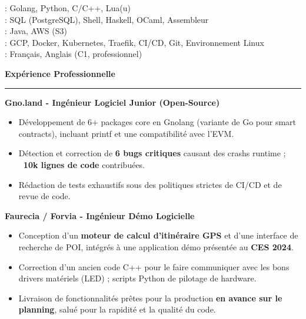 \documentclass[9pt]{extarticle}
\begin{document}
\hspace*{5pt}{\bfseries Maîtrise}: Golang, Python, C/C++, Lua(u)
\\
\hspace*{5pt}{\bfseries Bonne connaissance}: SQL (PostgreSQL), Shell, Haskell, OCaml, Assembleur
\\
\hspace*{5pt}{\bfseries Notions}: Java, AWS (S3)
\\
\hspace*{5pt}{\bfseries Cloud \& DevOps}: GCP, Docker, Kubernetes, Traefik, CI/CD, Git, Environnement Linux
\\
\hspace*{5pt}{\bfseries Langues}: Français, Anglais (C1, professionnel)

\par\vspace{5pt}


{\large\bfseries Expérience Professionnelle}
\par\vspace{-8pt}
\rule{\linewidth}{0.4pt}
\par\vspace{5pt}

{\bfseries Gno.land - Ingénieur Logiciel Junior (Open-Source)}
\begin{itemize}[noitemsep, topsep=0pt]
	\item Développement de 6+ packages core en Gnolang (variante de Go pour smart contracts), incluant printf et une compatibilité avec l'EVM.
	\item Détection et correction de {\bfseries 6 bugs critiques} causant des crashs runtime ; {\bfseries ~10k lignes de code} contribuées.
	\item Rédaction de tests exhaustifs sous des politiques strictes de CI/CD et de revue de code.
\end{itemize}

\par\vspace{5pt}

{\bfseries Faurecia / Forvia - Ingénieur Démo Logicielle}
\begin{itemize}[noitemsep, topsep=0pt]
	\item Conception d'un {\bfseries moteur de calcul d'itinéraire GPS} et d'une interface de recherche de POI, intégrés à une application démo présentée au {\bfseries CES 2024}.
	\item Correction d'un ancien code C++ pour le faire communiquer avec les bons drivers matériels (LED) ; scripts Python de pilotage de hardware.
	\item Livraison de fonctionnalités prêtes pour la production {\bfseries en avance sur le planning}, salué pour la rapidité et la qualité du code.
\end{itemize}
\end{document}
